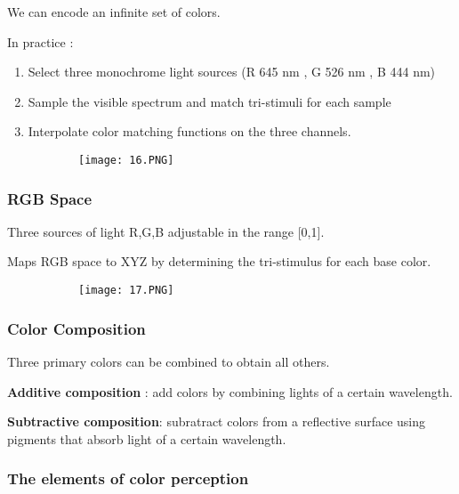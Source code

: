 \documentclass{article}
\begin{document}
We can encode an infinite set of colors.

In practice : 

\begin{enumerate}
    \item Select three monochrome light sources (R 645 nm , G 526 nm , B 444 nm)
    \item Sample the visible spectrum and match tri-stimuli for each sample
    \item Interpolate color matching functions on the three channels.
\end{enumerate}

\begin{figure}[ht!]
  \centering
  \begin{subfigure}[b]{0.5\linewidth}
    \texttt{[image: 16.PNG]}
  \end{subfigure}
\end{figure}


\vspace{10mm}

\subsubsection{RGB Space}

Three sources of light R,G,B adjustable in the range [0,1].

Maps RGB space to XYZ by determining the tri-stimulus for each base color.

\begin{figure}[ht!]
  \centering
  \begin{subfigure}[b]{0.3\linewidth}
    \texttt{[image: 17.PNG]}
  \end{subfigure}
\end{figure}

\subsubsection{Color Composition}

Three primary colors can be combined to obtain all others.

\textbf{Additive composition} : add colors by combining lights of a certain wavelength.

\textbf{Subtractive composition}: subratract colors from a reflective surface using pigments that absorb light of a certain wavelength.

\subsubsection{The elements of color perception}
\end{document}
